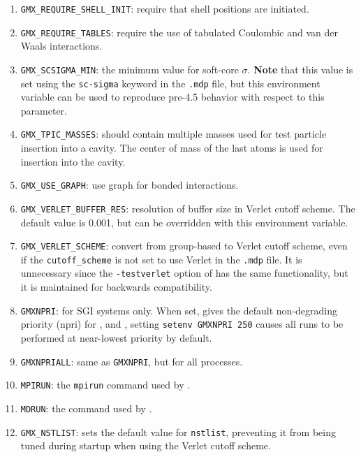 \begin{enumerate}
\item   {\tt GMX_REQUIRE_SHELL_INIT}: require that shell positions are initiated.
\item   {\tt GMX_REQUIRE_TABLES}: require the use of tabulated Coulombic
        and van der Waals interactions.
\item   {\tt GMX_SCSIGMA_MIN}: the minimum value for soft-core $\sigma$. {\bf Note} that this value is set
        using the {\tt sc-sigma} keyword in the {\tt .mdp} file, but this environment variable can be used
        to reproduce pre-4.5 behavior with respect to this parameter.
\item   {\tt GMX_TPIC_MASSES}: should contain multiple masses used for test particle insertion into a cavity.
        The center of mass of the last atoms is used for insertion into the cavity.
\item   {\tt GMX_USE_GRAPH}: use graph for bonded interactions.
\item   {\tt GMX_VERLET_BUFFER_RES}: resolution of buffer size in Verlet cutoff scheme.  The default value is
        0.001, but can be overridden with this environment variable.
\item   {\tt GMX_VERLET_SCHEME}: convert from group-based to Verlet cutoff scheme, even if the {\tt cutoff_scheme} is
        not set to use Verlet in the {\tt .mdp} file. It is unnecessary since the {\tt -testverlet} option of
        {\tt {}} has the same functionality, but it is maintained for backwards compatibility.
\item   {\tt GMXNPRI}: for SGI systems only. When set, gives the default non-degrading priority (npri) 
        for {\tt {}}, {\tt {}} and {\tt {}},
        {\eg} setting {\tt setenv GMXNPRI 250} causes all runs to be performed at near-lowest priority by default.
\item   {\tt GMXNPRIALL}: same as {\tt GMXNPRI}, but for all processes.
\item   {\tt MPIRUN}: the {\tt mpirun} command used by {\tt {}}.
\item   {\tt MDRUN}: the {\tt {}} command used by {\tt {}}.
\item   {\tt GMX_NSTLIST}: sets the default value for {\tt nstlist}, preventing it from being tuned during
        {\tt {}} startup when using the Verlet cutoff scheme.

\end{enumerate}

